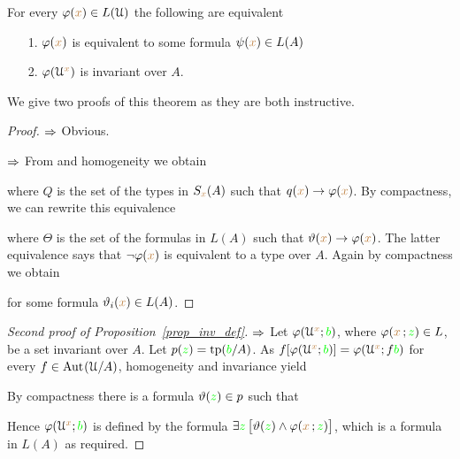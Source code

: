 \begin{proposition}\label{prop_inv_def}
For every $\varphi({\color{brown} x})\in L(\EuScript U)$ the following are equivalent
\begin{itemize}
 \item[1.] $\varphi({\color{brown} x})$ is equivalent to some formula $\psi({\color{brown} x})\in L(A)$
 \item[2.] $\varphi(\EuScript U^{\color{brown} x})$ is invariant over $A$.
\end{itemize}
\end{proposition}

We give two proofs of this theorem as they are both instructive.

\vspace*{-\parskip}
\begin{proof}
$\Rightarrow$ Obvious.

$\Rightarrow$ From  and homogeneity we obtain


where $Q$ is the set of the types in $S_{\color{brown} x}(A)$ such that $q({\color{brown} x})\rightarrow\varphi({\color{brown} x})$. 
By compactness, we can rewrite this equivalence 


where $\Theta$ is the set of the formulas in $L(A)$ such that $\vartheta({\color{brown} x})\rightarrow\varphi({\color{brown} x})$.
The latter equivalence says that $\neg\varphi({\color{brown} x})$ is equivalent to a type over $A$. 
Again by compactness we obtain 


for some formula $\vartheta_i({\color{brown} x})\in L(A)$.
\end{proof}

\begin{proof}[Second proof of Proposition~\ref{prop_inv_def}] 
   $\Rightarrow$ 
   Let $\varphi(\EuScript U^{\color{brown} x};{\color{green} b})$, where $\varphi({\color{brown} x}\,;{\color{green} z})\in L$, be a set invariant over $A$.
   Let $p({\color{green} z})={\rm tp}({\color{green} b}/A)$.
   As $f[\varphi(\EuScript U^{\color{brown} x};{\color{green} b})]=\varphi(\EuScript U^{\color{brown} x};f{\color{green} b})$ for every $f\in{\rm Aut\kern.15ex}(\EuScript U/A)$, homogeneity and invariance yield
   

By compactness there is a formula $\vartheta({\color{green} z})\in p$ such that 


Hence  $\varphi(\EuScript U^{\color{brown} x};{\color{green} b})$ is defined by the formula $\exists {\color{green}z}\,\big[\vartheta({\color{green} z})\wedge\varphi({\color{brown} x}\,;{\color{green} z})\big]$, which is a formula in $L(A)$ as required.
\end{proof}

